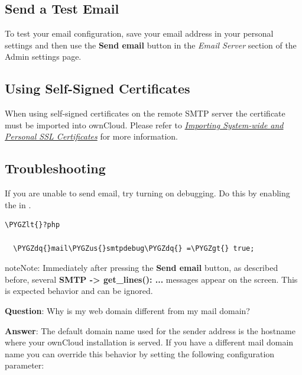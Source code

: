 \documentclass[letterpaper,10pt,english]{sphinxmanual}
\def\PYGZus{\char`\_}
\def\PYGZlt{\char`\<}
\def\PYGZgt{\char`\>}
\def\PYGZdq{\char`\"}
\begin{document}
\subsection{Send a Test Email}
\label{configuration_server/email_configuration:send-a-test-email}
To test your email configuration, save your email address in your personal
settings and then use the \textbf{Send email} button in the \emph{Email Server} section
of the Admin settings page.


\subsection{Using Self-Signed Certificates}
\label{configuration_server/email_configuration:using-self-signed-certificates}
When using self-signed certificates on the remote SMTP server the certificate
must be imported into ownCloud. Please refer to {\hyperref[configuration_server/import_ssl_cert::doc]{\emph{\emph{Importing System-wide and Personal SSL Certificates}}}} for more information.


\subsection{Troubleshooting}
\label{configuration_server/email_configuration:troubleshooting}
If you are unable to send email, try turning on debugging. Do this by enabling
the  in .

\begin{Verbatim}[commandchars=\\\{\}]
\PYGZlt{}?php

  \PYGZdq{}mail\PYGZus{}smtpdebug\PYGZdq{} =\PYGZgt{} true;
\end{Verbatim}

\begin{notice}{note}{Note:}
Immediately after pressing the \textbf{Send email} button, as described
before, several \textbf{SMTP -\textgreater{} get\_lines(): ...} messages appear on the screen.
This is expected behavior and can be ignored.
\end{notice}

\textbf{Question}: Why is my web domain different from my mail domain?

\textbf{Answer}: The default domain name used for the sender address is the hostname
where your ownCloud installation is served.  If you have a different mail domain
name you can override this behavior by setting the following configuration
parameter:
\end{document}
